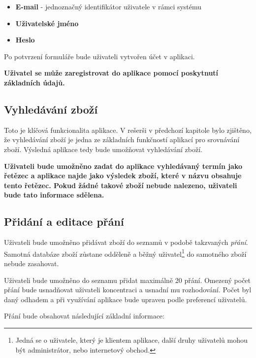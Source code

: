 \begin{itemize}
\item \textbf{E-mail} - jednoznačný identifikátor uživatele v rámci systému
\item \textbf{Uživatelské jméno}
\item \textbf{Heslo}
\end{itemize}

Po potvrzení formuláře bude uživateli vytvořen účet v aplikaci.

\textbf{Uživatel se může zaregistrovat do aplikace pomocí poskytnutí základních údajů.} 

\subsection{Vyhledávání zboží}
\label{sec:vyhledavani}
Toto je klíčová funkcionalita aplikace. V rešerši v předchozí kapitole bylo zjištěno, že vyhledávání zboží je jedna ze základních funkčností aplikací pro srovnávání zboží. Výsledná aplikace tedy bude umožňovat vyhledávání zboží.

\textbf{Uživateli bude umožněno zadat do aplikace vyhledávaný termín jako řetězec a aplikace najde jako výsledek zboží, které v názvu obsahuje tento řetězec. Pokud žádné takové zboží nebude nalezeno, uživateli bude tato informace sdělena.}%

\subsection{Přidání a editace přání}
\label{sec:pridani-prani}
Uživateli bude umožněno přidávat zboží do seznamů v podobě takzvaných \emph{přání}. Samotná databáze zboží zůstane odděleně a běžný uživatel\footnote{Jedná se o uživatele, který je klientem aplikace, další druhy uživatelů mohou být administrátor, nebo internetový obchod.} do samotného zboží nebude zasahovat.

Uživateli bude umožněno do seznamu přidat maximálně 20 přání. Omezený počet přání bude usnadňovat uživateli koncentraci a usnadní mu rozhodování\cite{iyengar2004much}. Počet byl daný odhadem a při využívání aplikace bude upraven podle preferencí uživatelů.

Přání bude obsahovat následující základní informace:

